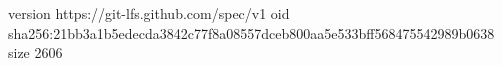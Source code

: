 version https://git-lfs.github.com/spec/v1
oid sha256:21bb3a1b5edecda3842c77f8a08557dceb800aa5e533bff568475542989b0638
size 2606
